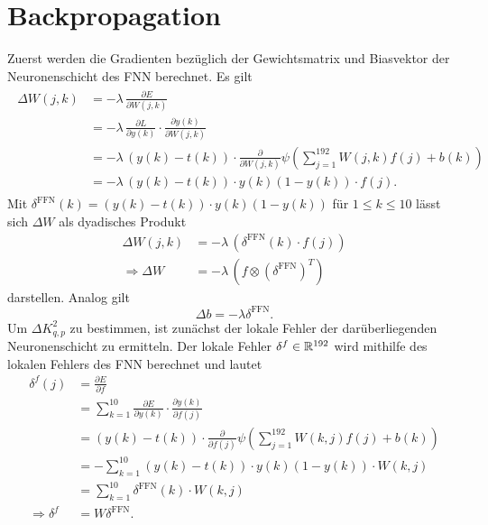 \section*{Backpropagation}
Zuerst werden die Gradienten bezüglich der Gewichtsmatrix und Biasvektor der Neuronenschicht des FNN berechnet. Es gilt
\begin{align}
    \begin{split}
        \Delta W(j,k) &= -\lambda \, \frac{\partial E}{\partial W(j,k)}\\
                       &= -\lambda \, \frac{\partial L}{\partial y(k)} \cdot \frac{\partial y(k)}{\partial W(j,k)}\\
                       &=-\lambda \, (y(k)-t(k)) \cdot \frac{\partial}{\partial W(j,k)} \psi \left(\sum_{j=1}^{192} W(j,k) f(j)+b(k)\right)\\
                       &=-\lambda \, (y(k)-t(k)) \cdot y(k)(1-y(k)) \cdot f(j).
     \end{split}
\end{align}
Mit $\delta^{\text{FFN}}(k)=(y(k)-t(k)) \cdot y(k)(1-y(k))$ für $1 \leq k \leq 10$ lässt sich $\Delta W$ als dyadisches Produkt  
\begin{align*}
    \Delta W(j,k)&=-\lambda \, \left(\delta^{\text{FFN}}(k) \cdot f(j) \right) \\
    \Rightarrow  \Delta W&=-\lambda \,\left(f \otimes (\delta^{\text{FFN}})^T\right)   
\end{align*}
darstellen. Analog gilt
\begin{equation*}
\Delta b= -\lambda \delta^{\text{FFN}}.
\end{equation*}
Um $ \Delta K^2_{q,p}$ zu bestimmen, ist zunächst der lokale Fehler der darüberliegenden Neuronenschicht zu ermitteln. Der lokale Fehler $\delta^f \in \mathbb{R}^{192}$ wird mithilfe des lokalen Fehlers des FNN berechnet und lautet
\begin{align*}
    \delta^f(j) &=  \frac{\partial E}{\partial f} \\
                &=  \sum_{k=1}^{10} \frac{\partial E}{\partial y(k)} \cdot \frac{\partial y(k)}{\partial f(j)} \\
                &=  (y(k)-t(k)) \cdot \frac{\partial}{\partial f(j)} \psi \left(\sum_{j=1}^{192} W(k,j) f(j) +b(k)\right) \\
                &=-  \sum_{k=1}^{10} (y(k)-t(k)) \cdot y(k)(1-y(k)) \cdot W(k,j) \\
                &=\sum_{k=1}^{10} \delta^{\text{FFN}}(k) \cdot W(k,j) \\
                \Rightarrow \delta^f &= W \delta^{\text{FFN}}.
\end{align*}
